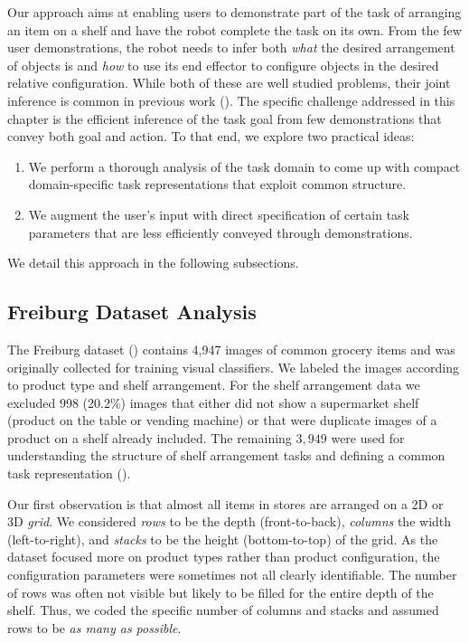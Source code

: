 Our approach aims at enabling users to demonstrate part of the task of arranging an item on a shelf and have the robot complete the task on its own.
From the few user demonstrations, the robot needs to infer both {\em what} the desired arrangement of objects is and {\em how} to use its end effector to configure objects in the desired relative configuration. 
While both of these are well studied problems, their joint inference is common in previous work (\eg \cite{akgun2016simultaneously}). 
The specific challenge addressed in this chapter is the efficient inference of the task goal from few demonstrations that convey both goal and action. 
To that end, we explore two practical ideas:
\begin{enumerate}
	\item We perform a thorough analysis of the task domain to come up with compact domain-specific task representations that exploit common structure.
	\item We augment the user's input with direct specification of certain task parameters that are less efficiently conveyed through demonstrations. 
\end{enumerate}

We detail this approach in the following subsections.

\subsection{Freiburg Dataset Analysis}
\label{sec:irosdata-analysis}

The Freiburg dataset (\cite{jund2016freiburg}) contains 4,947 images of common grocery items and was originally collected for training visual classifiers.
We labeled the images according to product type and shelf arrangement. For the shelf arrangement data we excluded 998 (20.2\%) images that either did not show a supermarket shelf (\eg product on the table or vending machine) or that were duplicate images of a product on a shelf already included.
The remaining $3,949$ were used for understanding the structure of shelf arrangement tasks and defining a common task representation ().

Our first observation is that almost all items in stores are arranged on a 2D or 3D {\em grid}.
We considered \textit{rows} to be the depth (front-to-back), \textit{columns} the width (left-to-right), and \textit{stacks} to be the height (bottom-to-top) of the grid.
As the dataset focused more on product types rather than product configuration, the configuration parameters were sometimes not all clearly identifiable.
The number of rows was often not visible but likely to be filled for the entire depth of the shelf.
Thus, we coded the specific number of columns and stacks and assumed rows to be \textit{as many as possible}.
